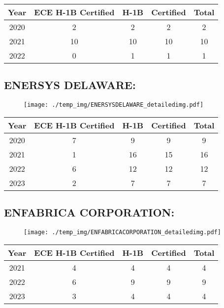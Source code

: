 \documentclass{article}%
\begin{document}
%
\begin{longtable}{c|c|c|c|c}%
\hline%
Year&ECE H{-}1B Certified&H{-}1B&Certified&Total\\%
\hline%
2020&2&2&2&2\\%
\hline%
2021&10&10&10&10\\%
\hline%
2022&0&1&1&1\\%
\hline%
\end{longtable}

%
\newpage%
\subsection{ENERSYS DELAWARE:}%
\label{subsec:ENERSYSDELAWARE}%
\label{ENERSYSDELAWAREdetailed}%


\begin{figure}[htbp]%
\centering%
\texttt{[image: ./temp\_img/ENERSYSDELAWARE\_detailedimg.pdf]}%
\end{figure}

%
\begin{longtable}{c|c|c|c|c}%
\hline%
Year&ECE H{-}1B Certified&H{-}1B&Certified&Total\\%
\hline%
2020&7&9&9&9\\%
\hline%
2021&1&16&15&16\\%
\hline%
2022&6&12&12&12\\%
\hline%
2023&2&7&7&7\\%
\hline%
\end{longtable}

%
\newpage%
\subsection{ENFABRICA CORPORATION:}%
\label{subsec:ENFABRICACORPORATION}%
\label{ENFABRICACORPORATIONdetailed}%


\begin{figure}[htbp]%
\centering%
\texttt{[image: ./temp\_img/ENFABRICACORPORATION\_detailedimg.pdf]}%
\end{figure}

%
\begin{longtable}{c|c|c|c|c}%
\hline%
Year&ECE H{-}1B Certified&H{-}1B&Certified&Total\\%
\hline%
2021&4&4&4&4\\%
\hline%
2022&6&9&9&9\\%
\hline%
2023&3&4&4&4\\%
\hline%
\end{longtable}
\end{document}
